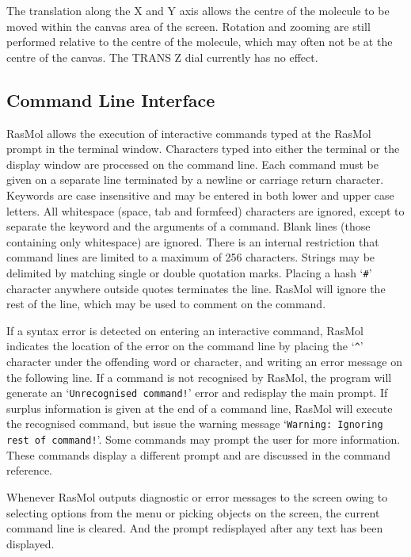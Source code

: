 The translation along the X and Y axis allows the centre of the molecule 
to be moved within the canvas area of the screen. Rotation and zooming are 
still performed relative to the centre of the molecule, which may often not 
be at the centre of the canvas. The TRANS Z dial currently has no effect.

\subsection{Command Line Interface}
\label{Command}
RasMol allows the execution of interactive commands typed at the RasMol
prompt in the terminal window. Characters typed into either the terminal 
or the display window are processed on the command line. Each command must
be given on a separate line terminated by a newline or carriage return
character. Keywords are case insensitive and may be entered in both lower
and upper case letters. All whitespace (space, tab and formfeed) characters
are ignored, except to separate the keyword and the arguments of a command. 
Blank lines (those containing only whitespace) are ignored. There is an
internal restriction that command lines are limited to a maximum of 256
characters. Strings may be delimited by matching single or double quotation 
marks. Placing a hash `{\tt \#}' character anywhere outside quotes 
terminates the line. RasMol will ignore the rest of the line, which may 
be used to comment on the command.

If a syntax error is detected on entering an interactive command, RasMol
indicates the location of the error on the command line by placing the
`\verb"^"' character under the offending word or character, and writing an
error message on the following line. If a command is not recognised by
RasMol, the program will generate an `{\tt Unrecognised command!}' error
and redisplay the main prompt. If surplus information is given at the end
of a command line, RasMol will execute the recognised command, but issue
the warning message `{\tt Warning: Ignoring rest of command!}'. Some 
commands may prompt the user for more information. These commands display
a different prompt and are discussed in the command reference. 

Whenever RasMol outputs diagnostic or error messages to the screen owing
to selecting options from the menu or picking objects on the screen, the 
current command line is cleared. And the prompt redisplayed after any text 
has been displayed.

